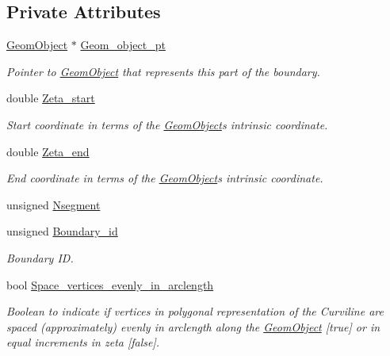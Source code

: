 \subsection*{Private Attributes}
\begin{DoxyCompactItemize}
\item 
\hyperlink{classoomph_1_1GeomObject}{Geom\+Object} $\ast$ \hyperlink{classoomph_1_1TriangleMeshCurviLine_a8517e012895a1b48d6d664573650f2c6}{Geom\+\_\+object\+\_\+pt}
\begin{DoxyCompactList}\small\item\em Pointer to \hyperlink{classoomph_1_1GeomObject}{Geom\+Object} that represents this part of the boundary. \end{DoxyCompactList}\item 
double \hyperlink{classoomph_1_1TriangleMeshCurviLine_aa89105fb5ab773ff8ee49fc32cf066d0}{Zeta\+\_\+start}
\begin{DoxyCompactList}\small\item\em Start coordinate in terms of the \hyperlink{classoomph_1_1GeomObject}{Geom\+Object}\textquotesingle{}s intrinsic coordinate. \end{DoxyCompactList}\item 
double \hyperlink{classoomph_1_1TriangleMeshCurviLine_a4e0eb74c99bee668bb97ac2e896b3ee0}{Zeta\+\_\+end}
\begin{DoxyCompactList}\small\item\em End coordinate in terms of the \hyperlink{classoomph_1_1GeomObject}{Geom\+Object}\textquotesingle{}s intrinsic coordinate. \end{DoxyCompactList}\item 
unsigned \hyperlink{classoomph_1_1TriangleMeshCurviLine_ad623f3774469ffacddb79862263ad70d}{Nsegment}
\item 
unsigned \hyperlink{classoomph_1_1TriangleMeshCurviLine_a142f76f360a6f18067e089f860bfb422}{Boundary\+\_\+id}
\begin{DoxyCompactList}\small\item\em Boundary ID. \end{DoxyCompactList}\item 
bool \hyperlink{classoomph_1_1TriangleMeshCurviLine_a36ad5bcb2bc7abac6f91084c1f715118}{Space\+\_\+vertices\+\_\+evenly\+\_\+in\+\_\+arclength}
\begin{DoxyCompactList}\small\item\em Boolean to indicate if vertices in polygonal representation of the Curviline are spaced (approximately) evenly in arclength along the \hyperlink{classoomph_1_1GeomObject}{Geom\+Object} \mbox{[}true\mbox{]} or in equal increments in zeta \mbox{[}false\mbox{]}. \end{DoxyCompactList}\item 

\end{DoxyCompactItemize}
